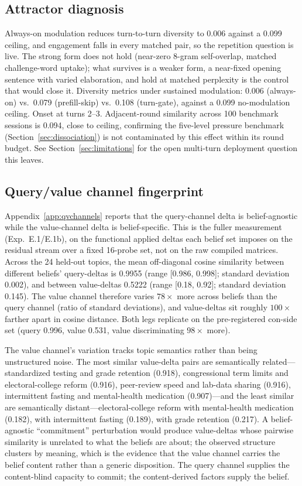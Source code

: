 \subsection{Attractor diagnosis}
\label{app:attractor}
Always-on modulation reduces turn-to-turn diversity to 0.006 against a 0.099 ceiling, and
engagement falls in every matched pair, so the repetition question is live. The strong form
does not hold (near-zero 8-gram self-overlap, matched challenge-word uptake); what survives is
a weaker form, a near-fixed opening sentence with varied elaboration, and hold at matched
perplexity is the control that would close it.
Diversity metrics under sustained modulation: 0.006 (always-on) vs.\ 0.079
(prefill-skip) vs.\ 0.108 (turn-gate), against a 0.099 no-modulation ceiling. Onset at
turns 2--3. Adjacent-round similarity across 100 benchmark sessions is 0.094, close to
ceiling, confirming the five-level pressure benchmark (Section~\ref{sec:dissociation})
is not contaminated by this effect within its round budget. See
Section~\ref{sec:limitations} for the open multi-turn deployment question this leaves.

\subsection{Query/value channel fingerprint}
\label{app:qv}
Appendix~\ref{app:qvchannels} reports that the query-channel delta is
belief-agnostic while the value-channel delta is belief-specific. This is the fuller
measurement (Exp.~E.1/E.1b), on the functional applied deltas each belief set imposes on
the residual stream over a fixed 16-probe set, not on the raw compiled matrices. Across the
24 held-out topics, the mean off-diagonal cosine similarity between different beliefs'
query-deltas is 0.9955 (range [0.986, 0.998]; standard deviation 0.002), and between
value-deltas 0.5222 (range [0.18, 0.92]; standard deviation 0.145). The value channel
therefore varies \(78\times\) more across beliefs than the query channel (ratio of standard
deviations), and value-deltas sit roughly \(100\times\) farther apart in cosine distance.
Both legs replicate on the pre-registered con-side set (query 0.996, value 0.531, value
discriminating \(98\times\) more).

The value channel's variation tracks topic semantics rather than being unstructured noise.
The most similar value-delta pairs are semantically related---standardized testing and
grade retention (0.918), congressional term limits and electoral-college reform (0.916),
peer-review speed and lab-data sharing (0.916), intermittent fasting and mental-health
medication (0.907)---and the least similar are semantically distant---electoral-college
reform with mental-health medication (0.182), with intermittent fasting (0.189), with grade
retention (0.217). A belief-agnostic ``commitment'' perturbation would produce value-deltas
whose pairwise similarity is unrelated to what the beliefs are about; the observed structure
clusters by meaning, which is the evidence that the value channel carries the belief content
rather than a generic disposition. The query channel supplies the content-blind capacity to
commit; the content-derived factors supply the belief.

